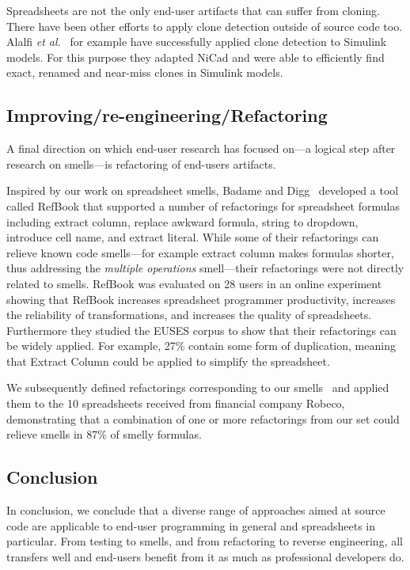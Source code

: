 \documentclass[conference]{IEEEtran}
\begin{document}
Spreadsheets are not the only end-user artifacts that can suffer from cloning. There have been other efforts to apply clone detection outside of source code too. Alalfi \emph{et al.}~\cite{DBLP:conf/icsm/Alalfi2012} for example have successfully applied clone detection to Simulink models. For this purpose they adapted NiCad and were able to efficiently find exact, renamed and near-miss clones in Simulink models.

\subsection{Improving/re-engineering/Refactoring}
A final direction on which end-user research has focused on---a logical step after research on smells---is refactoring of end-users artifacts. 


Inspired by our work on spreadsheet smells, Badame and Digg~\cite{badame_refactoring_2012} developed a tool called RefBook that supported a number of refactorings for spreadsheet formulas including extract column, replace awkward formula, string to dropdown, introduce cell name, and extract literal. While some of their refactorings can relieve known code smells---for example extract column makes formulas shorter, thus addressing the \emph{multiple operations} smell---their refactorings were not directly related to smells. RefBook was evaluated on 28 users in an online experiment showing that RefBook increases spreadsheet programmer
productivity, increases the reliability of transformations, and increases the quality of spreadsheets. Furthermore they studied the EUSES corpus to show that their refactorings can be widely applied. For example, 27\%  contain some form of duplication, meaning that Extract Column could be applied to simplify the spreadsheet.

We subsequently defined refactorings corresponding to our smells~\cite{hermans_detecting_2014} and applied them to the 10 spreadsheets received from financial company Robeco, demonstrating that a combination of one or more refactorings from our set could relieve smells in 87\% of smelly formulas.

\subsection{Conclusion}
In conclusion, we conclude that a diverse range of approaches aimed at source code are applicable to end-user programming in general and spreadsheets in particular. From testing to smells, and from refactoring to reverse engineering, all transfers well and end-users benefit from it as much as professional developers do.
\end{document}
